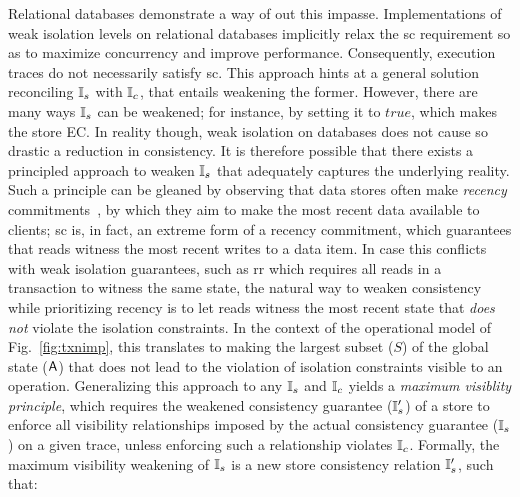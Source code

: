 Relational databases demonstrate a way of out this impasse.
Implementations of weak isolation levels on relational databases
implicitly relax the {\sc sc} requirement so as to maximize
concurrency and improve performance. Consequently, execution traces do
not necessarily satisfy {\sc sc}. This approach hints at a general
solution reconciling $\mathbb{I}_s$ with $\mathbb{I}_c$, that entails weakening the
former. However, there are many ways $\mathbb{I}_s$ can be weakened; for
instance, by setting it to $true$, which makes the store EC. In
reality though, weak isolation on databases does not cause so drastic
a reduction in consistency. It is therefore possible that there exists
a principled approach to weaken $\mathbb{I}_s$ that adequately captures the
underlying reality. Such a principle can be gleaned by observing that
data stores often make \emph{recency} commitments~\cite{bailishat}, by
which they aim to make the most recent data available to clients; {\sc
  sc} is, in fact, an extreme form of a recency commitment, which
guarantees that reads witness the most recent writes to a data
item. In case this conflicts with weak isolation guarantees, such as
{\sc rr} which requires all reads in a transaction to witness the same
state, the natural way to weaken consistency while prioritizing
recency is to let reads witness the most recent state that \emph{does
  not} violate the isolation constraints. In the context of the
operational model of Fig.~\ref{fig:txnimp}, this translates to making
the largest subset ($S$) of the global state ($\textsf{A}$) that does not lead
to the violation of isolation constraints visible to an
operation. Generalizing this approach to any $\mathbb{I}_s$ and $\mathbb{I}_c$ yields
a \emph{maximum visiblity principle}, which requires the weakened
consistency guarantee ($\mathbb{I}_s'$) of a store to enforce all visibility
relationships imposed by the actual consistency guarantee ($\mathbb{I}_s$) on
a given trace, unless enforcing such a relationship violates $\mathbb{I}_c$.
Formally, the maximum visibility weakening of $\mathbb{I}_s$ is a new store
consistency relation $\mathbb{I}_s'$, such that:
